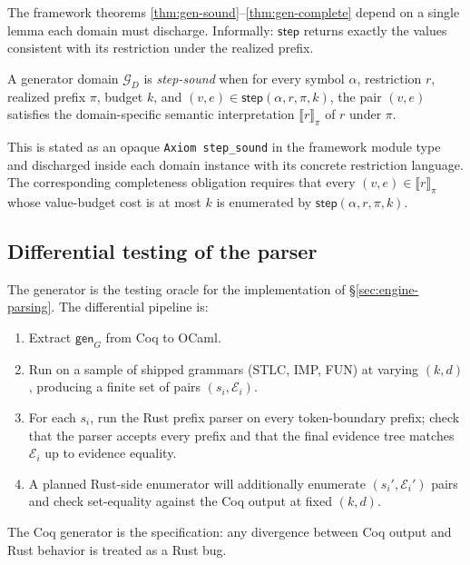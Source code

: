 The framework theorems \ref{thm:gen-sound}--\ref{thm:gen-complete} depend on
a single lemma each domain must discharge. Informally:
\(\mathsf{step}\) returns exactly the values consistent with its restriction
under the realized prefix.

\begin{definition}
\label{def:step-sound}
A generator domain \(\mathcal{G}_D\) is \emph{step-sound} when for every
symbol \(\alpha\), restriction \(r\), realized prefix \(\pi\), budget \(k\),
and \((v, e) \in \mathsf{step}(\alpha, r, \pi, k)\), the pair \((v, e)\)
satisfies the domain-specific semantic interpretation
\(\llbracket r \rrbracket_\pi\) of \(r\) under \(\pi\).
\end{definition}

This is stated as an opaque \verb|Axiom step_sound| in the framework module
type and discharged inside each domain instance with its concrete restriction
language. The corresponding completeness obligation requires that every
\((v, e) \in \llbracket r \rrbracket_\pi\) whose value-budget cost is at most
\(k\) is enumerated by \(\mathsf{step}(\alpha, r, \pi, k)\).

\subsection{Differential testing of the parser}
\label{sec:gen-diff-test}

The generator is the testing oracle for the implementation of
\S\ref{sec:engine-parsing}. The differential pipeline is:
\begin{enumerate}[nosep]
  \item Extract \(\mathsf{gen}_G\) from Coq to OCaml.
  \item Run on a sample of shipped grammars (STLC, IMP, FUN) at varying
    \((k, d)\), producing a finite set of pairs \((s_i, \mathcal{E}_i)\).
  \item For each \(s_i\), run the Rust prefix parser on every token-boundary
    prefix; check that the parser accepts every prefix and that the final
    evidence tree matches \(\mathcal{E}_i\) up to evidence equality.
  \item A planned Rust-side enumerator will additionally enumerate
    \((s_i', \mathcal{E}_i')\) pairs and check set-equality against the Coq
    output at fixed \((k, d)\).
\end{enumerate}
The Coq generator is the specification: any divergence between Coq output
and Rust behavior is treated as a Rust bug.


